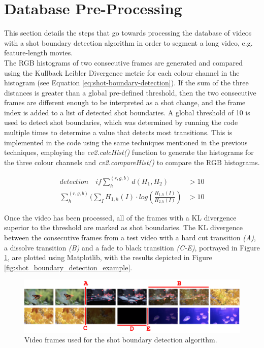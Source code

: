 \section{Database Pre-Processing}
\label{sec:database-pre-processing}

This section details the steps that go towards processing the database of videos with a shot boundary detection algorithm in order to segment a long video, e.g. feature-length movies.\\

The RGB histograms of two consecutive frames are generated and compared using the Kullback Leibler Divergence metric for each colour channel in the histogram (see Equation \ref{eq:shot-boundary-detection}). If the sum of the three distances is greater than a global pre-defined threshold, then the two consecutive frames are different enough to be interpreted as a shot change, and the frame index is added to a list of detected shot boundaries. A global threshold of 10 is used to detect shot boundaries, which was determined by running the code multiple times to determine a value that detects most transitions. This is implemented in the code using the same techniques mentioned in the previous techniques, employing the \textit{cv2.calcHist()} function to generate the histograms for the three colour channels and \textit{cv2.compareHist()} to compare the RGB histograms. 

\begin{equation}
\label{eq:shot-boundary-detection}
\begin{aligned}
    detection \quad if \sum_{h}^{(r,g,b)}d(H_1,H_2) & > 10 \\
    \sum_{h}^{(r,g,b)} (\sum_I H_{1,h}(I)\cdot log(\frac{H_{1,h}(I)}{H_{2,h}(I)}) & > 10
\end{aligned}
\end{equation}

Once the video has been processed, all of the frames with a KL divergence superior to the threshold are marked as shot boundaries. The KL divergence between the consecutive frames from a test video with a hard cut transition \textit{(A)}, a dissolve transition \textit{(B)} and a fade to black transition \textit{(C-E)}, portrayed in Figure \ref{fig:shot_boundary_detection_frames}, are plotted using Matplotlib, with the results depicted in Figure \ref{fig:shot_boundary_detection_example}.\\

\begin{figure}[h] 
\centerline{\includegraphics[width=\textwidth]{figures/implementation/shot_boundary_detection_frames.png}}
\caption{\label{fig:shot_boundary_detection_frames}Video frames used for the shot boundary detection algorithm.}
\end{figure}

